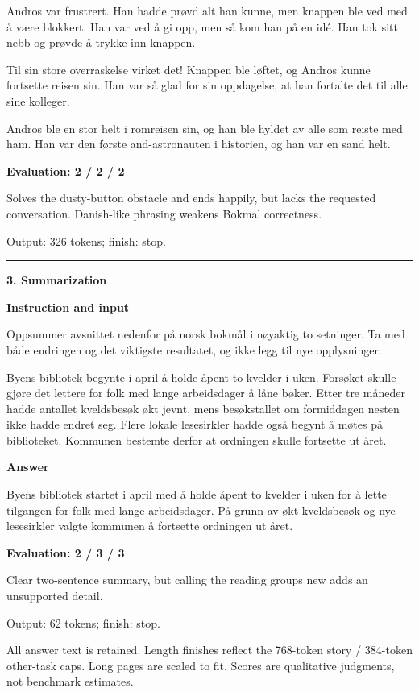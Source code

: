 \documentclass[10pt]{article}
\begin{document}
{\begin{minipage}{\textwidth}
Andros var frustrert. Han hadde prøvd alt han kunne, men knappen ble ved med å være blokkert. Han var ved å gi opp, men så kom han på en idé. Han tok sitt nebb og prøvde å trykke inn knappen.
\par\smallskip
Til sin store overraskelse virket det! Knappen ble løftet, og Andros kunne fortsette reisen sin. Han var så glad for sin oppdagelse, at han fortalte det til alle sine kolleger.
\par\smallskip
Andros ble en stor helt i romreisen sin, og han ble hyldet av alle som reiste med ham. Han var den første and-astronauten i historien, og han var en sand helt.\par\smallskip
\textbf{Evaluation: 2 / 2 / 2}\par Solves the dusty-button obstacle and ends happily, but lacks the requested conversation. Danish-like phrasing weakens Bokmal correctness.
\par {\color{gray} Output: 326 tokens; finish: stop.}\par
\medskip\hrule\smallskip
{\bfseries 3. Summarization}\par\smallskip
\textbf{Instruction and input}\par Oppsummer avsnittet nedenfor på norsk bokmål i nøyaktig to setninger. Ta med både endringen og det viktigste resultatet, og ikke legg til nye opplysninger.
\par\smallskip
Byens bibliotek begynte i april å holde åpent to kvelder i uken. Forsøket skulle gjøre det lettere for folk med lange arbeidsdager å låne bøker. Etter tre måneder hadde antallet kveldsbesøk økt jevnt, mens besøkstallet om formiddagen nesten ikke hadde endret seg. Flere lokale lesesirkler hadde også begynt å møtes på biblioteket. Kommunen bestemte derfor at ordningen skulle fortsette ut året.\par\smallskip
\textbf{Answer}\par Byens bibliotek startet i april med å holde åpent to kvelder i uken for å lette tilgangen for folk med lange arbeidsdager. På grunn av økt kveldsbesøk og nye lesesirkler valgte kommunen å fortsette ordningen ut året.\par\smallskip
\textbf{Evaluation: 2 / 3 / 3}\par Clear two-sentence summary, but calling the reading groups new adds an unsupported detail.
\par {\color{gray} Output: 62 tokens; finish: stop.}\par
\medskip\footnotesize All answer text is retained. Length finishes reflect the 768-token story / 384-token other-task caps. Long pages are scaled to fit. Scores are qualitative judgments, not benchmark estimates.
\end{minipage}}%
\end{document}
